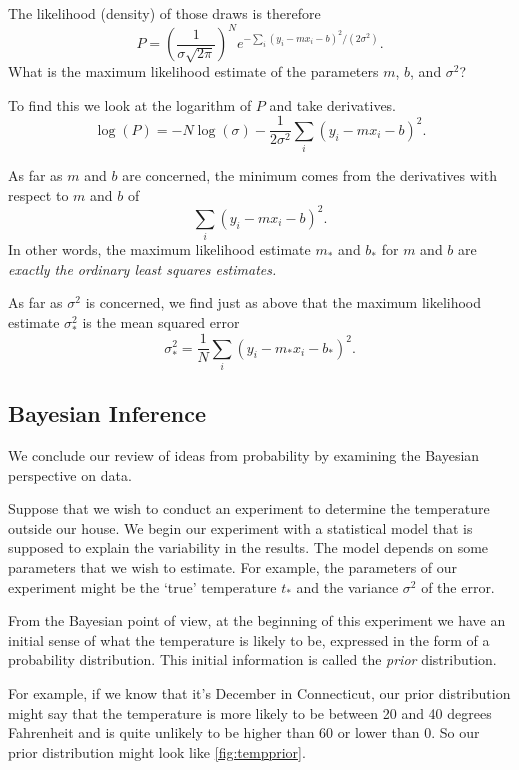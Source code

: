 \documentclass[
]{article}
\begin{document}
The likelihood (density) of those draws is therefore \[
P = \left(\frac{1}{\sigma\sqrt{2\pi}}\right)^Ne^{-\sum_{i}(y_i-mx_i-b)^2/(2\sigma^2)}.
\] What is the maximum likelihood estimate of the parameters \(m\),
\(b\), and \(\sigma^2\)?

To find this we look at the logarithm of \(P\) and take derivatives. \[
\log(P) = -N\log(\sigma) -\frac{1}{2\sigma^2}\sum_{i}(y_i-mx_i-b)^2.
\]

As far as \(m\) and \(b\) are concerned, the minimum comes from the
derivatives with respect to \(m\) and \(b\) of \[
\sum_{i}(y_i-mx_i-b)^2.
\] In other words, the maximum likelihood estimate \(m_*\) and \(b_*\)
for \(m\) and \(b\) are \emph{exactly the ordinary least squares
estimates.}

As far as \(\sigma^2\) is concerned, we find just as above that the
maximum likelihood estimate \(\sigma^2_*\) is the mean squared error \[
\sigma^2_*=\frac{1}{N}\sum_{i}(y_i-m_*x_i-b_*)^2.
\]

\hypertarget{bayesian-inference}{%
\subsection{Bayesian Inference}\label{bayesian-inference}}

We conclude our review of ideas from probability by examining the
Bayesian perspective on data.

Suppose that we wish to conduct an experiment to determine the
temperature outside our house. We begin our experiment with a
statistical model that is supposed to explain the variability in the
results. The model depends on some parameters that we wish to estimate.
For example, the parameters of our experiment might be the `true'
temperature \(t_*\) and the variance \(\sigma^2\) of the error.

From the Bayesian point of view, at the beginning of this experiment we
have an initial sense of what the temperature is likely to be, expressed
in the form of a probability distribution. This initial information is
called the \emph{prior} distribution.

For example, if we know that it's December in Connecticut, our prior
distribution might say that the temperature is more likely to be between
20 and 40 degrees Fahrenheit and is quite unlikely to be higher than 60
or lower than 0. So our prior distribution might look like
\cref{fig:tempprior}.
\end{document}
